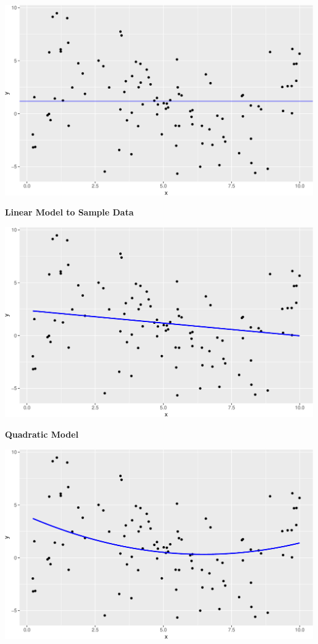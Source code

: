 \documentclass[
  letterpaper,
  DIV=11,
  numbers=noendperiod]{scrreprt}
\begin{document}
\includegraphics{Ch7_files/figure-pdf/unnamed-chunk-6-1.pdf}

\textbf{Linear Model to Sample Data}

\includegraphics{Ch7_files/figure-pdf/unnamed-chunk-7-1.pdf}

\textbf{Quadratic Model}

\includegraphics{Ch7_files/figure-pdf/unnamed-chunk-8-1.pdf}
\end{document}
